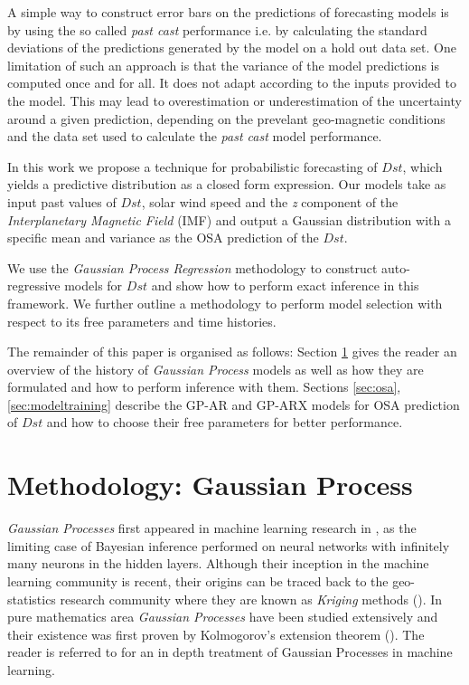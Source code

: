 A simple way to construct error bars on the predictions of forecasting models is by using the so called \textit{past cast} performance i.e. by calculating the standard deviations of the predictions generated by the model on a hold out data set. One limitation of such an approach is that the variance of the model predictions is computed once and for all. It does not adapt according to the inputs provided to the model. This may lead to overestimation or underestimation of the uncertainty around a given prediction, depending on the prevelant geo-magnetic conditions and the data set used to calculate the \textit{past cast} model performance.

In this work we propose a technique for probabilistic forecasting of $Dst$, which yields a predictive distribution as a closed form expression. Our models take as input past values of $Dst$, solar wind speed and the \textit{z} component of the \emph{Interplanetary Magnetic Field} (IMF) and output a Gaussian distribution with a specific mean and variance as the OSA prediction of the $Dst$. 

We use the \emph{Gaussian Process Regression} methodology to construct auto-regressive models for $Dst$ and show how to perform exact inference in this framework. We further outline a methodology to perform model selection with respect to its free parameters and time histories.

The remainder of this paper is organised as follows: Section \ref{sec:method} gives the reader an overview of the history of \emph{Gaussian Process} models as well as how they are formulated and how to perform inference with them. Sections \ref{sec:osa}, \ref{sec:modeltraining} describe the GP-AR and GP-ARX models for OSA prediction of $Dst$ and how to choose their free parameters for better performance. 

\section{Methodology: Gaussian Process} \label{sec:method}

\emph{Gaussian Processes} first appeared in machine learning research in \cite{Neal:1996:BLN:525544}, as the limiting case of Bayesian inference performed on neural networks with infinitely many neurons in the hidden layers. Although their inception in the machine learning community is recent, their origins can be traced back to the geo-statistics research community where they are known as \emph{Kriging} methods (\cite{krige1951statistical}). In pure mathematics area \emph{Gaussian Processes} have been studied extensively and their existence was first proven by Kolmogorov's extension theorem (\cite{tao2011introduction}). The reader is referred to \cite{Rasmussen:2005:GPM:1162254} for an in depth treatment of Gaussian Processes in machine learning.

